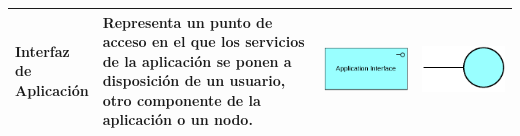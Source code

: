 {\begin{longtable}{|p{0.15\linewidth}|p{0.45\linewidth}|p{0.2\linewidth} p{0.2\linewidth}|}
    	Interfaz de Aplicación 
    	&
    	Representa un punto de acceso en el que los servicios de la aplicación se ponen a disposición de un usuario, otro componente de la aplicación o un nodo. 
    	&
    	\begin{center}
    		\includegraphics[width=1\linewidth]{imgs/Aplication_interface.pdf}
    	\end{center} &
    	\begin{center}
    		\includegraphics[width=0.7\linewidth]{imgs/interfaz.pdf}
    	\end{center}
    	\\ \hline
    	
    	
    	

\end{longtable}}
